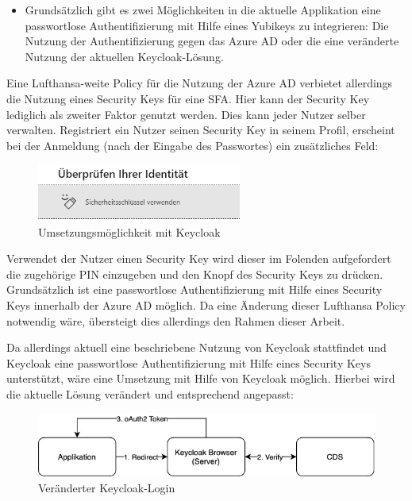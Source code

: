 \begin{itemize}
    \item Grundsätzlich gibt es zwei Möglichkeiten in die aktuelle Applikation eine passwortlose Authentifizierung mit Hilfe eines Yubikeys zu integrieren: Die Nutzung der Authentifizierung gegen das Azure \ac{AD} oder die eine veränderte Nutzung der aktuellen Keycloak-Lösung.

\end{itemize}

Eine Lufthansa-weite Policy für die Nutzung der Azure \ac{AD} verbietet allerdings die Nutzung eines Security Keys für eine \ac{SFA}. Hier kann der Security Key lediglich als zweiter Faktor genutzt werden. Dies kann jeder Nutzer selber verwalten. Registriert ein Nutzer seinen Security Key in seinem Profil, erscheint bei der Anmeldung (nach der Eingabe des Passwortes) ein zusätzliches Feld:

\begin{figure}[h]
	\centering 
	\includegraphics[width=0.6\textwidth]{img/abbildungen/azure_seckey.png}
	\captionsetup{format=hang}
	\caption{Umsetzungsmöglichkeit mit Keycloak}
\end{figure}

Verwendet der Nutzer einen Security Key wird dieser im Folenden aufgefordert die zugehörige PIN einzugeben und den Knopf des Security Keys zu drücken. Grundsätzlich ist eine passwortlose Authentifizierung mit Hilfe eines Security Keys innerhalb der Azure \ac{AD} möglich. Da eine Änderung dieser Lufthansa Policy notwendig wäre, übersteigt dies allerdings den Rahmen dieser Arbeit.

Da allerdings aktuell eine beschriebene Nutzung von Keycloak stattfindet und Keycloak eine passwortlose Authentifizierung mit Hilfe eines Security Keys unterstützt, wäre eine Umsetzung mit Hilfe von Keycloak möglich. Hierbei wird die aktuelle Lösung verändert und entsprechend angepasst:

\begin{figure}[h]
	\centering 
	\includegraphics[width=1\textwidth]{img/abbildungen/keycloak_browser.png}
	\captionsetup{format=hang}
	\caption{Veränderter Keycloak-Login}
\end{figure}

